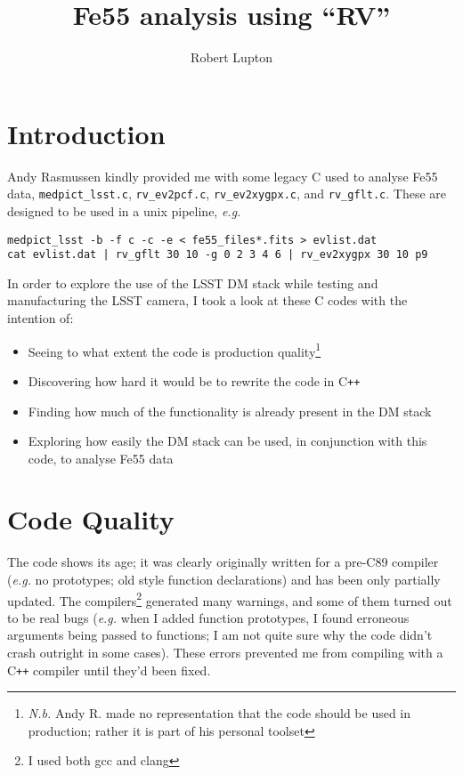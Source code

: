 \documentclass[12pt]{article}
\newcommand{\CPP}{C\texttt{++}\xspace}  %
\begin{document}
\title{Fe55 analysis using ``RV''}
\author{Robert Lupton}
\maketitle

\section{Introduction}

Andy Rasmussen kindly provided me with some legacy C used to analyse Fe55 data,
\texttt{medpict\_lsst.c}, \texttt{rv\_ev2pcf.c}, \texttt{rv\_ev2xygpx.c}, and \texttt{rv\_gflt.c}. These
are designed to be used in a unix pipeline, \textit{e.g.}
\begin{lstlisting}
medpict_lsst -b -f c -c -e < fe55_files*.fits > evlist.dat
cat evlist.dat | rv_gflt 30 10 -g 0 2 3 4 6 | rv_ev2xygpx 30 10 p9
\end{lstlisting}

In order to explore the use of the LSST DM stack while testing and manufacturing the LSST camera,
I took a look at these C codes with the intention of:
\begin{itemize}
  \item Seeing to what extent the code is production quality\footnote{\textit{N.b.} Andy R. made
    no representation that the code should be used in production;  rather it is part of his personal toolset}
  \item Discovering how hard it would be to rewrite the code in \CPP
  \item Finding how much of the functionality is already present in the DM stack
  \item Exploring how easily the DM stack can be used, in conjunction with this code, to analyse Fe55 data
\end{itemize}

\section{Code Quality}

The code shows its age;  it was clearly originally written for a pre-C89 compiler (\textit{e.g.} no
prototypes; old style function declarations) and has been only partially updated.
The compilers\footnote{I used both gcc and clang} generated many warnings, and some of them turned out to
be real bugs (\textit{e.g.} when I added function prototypes, I found erroneous arguments being passed
to functions;  I am not quite sure why the code didn't crash outright in some cases).  These errors
prevented me from compiling with a \CPP compiler until they'd been fixed.
\end{document}
